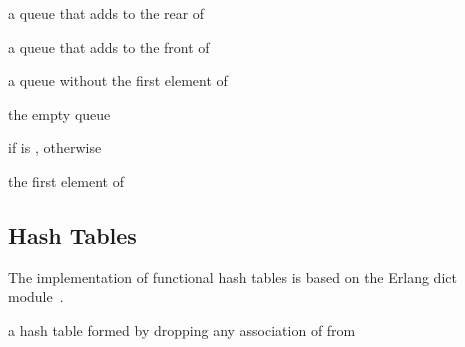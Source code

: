 \begin{procedure}
\end{procedure}
\returns{} a queue that adds  to the rear of 

\begin{procedure}
\end{procedure}
\returns{} a queue that adds  to the front of 

\begin{procedure}
\end{procedure}
\returns{} a queue without the first element of 

\begin{syntax}
\end{syntax}
\returns{} the empty queue

\begin{procedure}
\end{procedure}
\returns{}  if  is ,  otherwise

\begin{procedure}
\end{procedure}
\returns{} the first element of 

\subsection{Hash Tables}

The implementation of functional hash tables is based on the Erlang
dict module~\cite{dict-ref,dynamic-hashing}.

\begin{procedure}
\end{procedure}
\returns{} a hash table formed by dropping any association of
 from 

